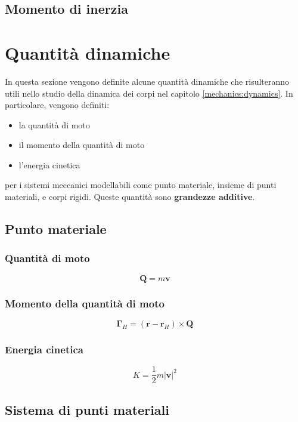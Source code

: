 \subsection{Momento di inerzia}

\section{Quantità dinamiche}
In questa sezione vengono definite alcune quantità dinamiche che risulteranno utili nello studio della dinamica dei corpi nel capitolo \ref{mechanics:dynamics}. In particolare, vengono definiti:
\begin{itemize}
  \item la quantità di moto
  \item il momento della quantità di moto
  \item l'energia cinetica
\end{itemize}
per i sistemi meccanici modellabili come punto materiale, insieme di punti materiali, e corpi rigidi.
Queste quantità sono \textbf{grandezze additive}.

\subsection{Punto materiale}
\subsubsection{Quantità di moto}
\begin{equation}
  \mathbf{Q} = m \mathbf{v}
\end{equation}
\subsubsection{Momento della quantità di moto}
\begin{equation}
    \mathbf{\Gamma}_H = \left(\mathbf{r} - \mathbf{r}_H \right) \times \mathbf{Q}
\end{equation}
\subsubsection{Energia cinetica}
\begin{equation}
    K = \dfrac{1}{2} m | \mathbf{v} |^2
\end{equation}

\subsection{Sistema di punti materiali}
